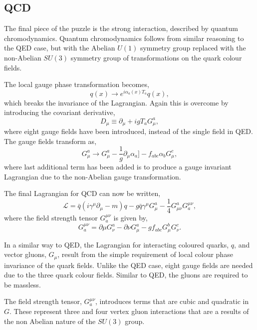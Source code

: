 \subsection{QCD}
The final piece of the puzzle is the strong interaction, described by quantum
chromodynamics. 
Quantum chromodynamics follows from similar reasoning to the QED case, but with
the Abelian $U(1)$ symmetry group replaced with the non-Abelian $SU(3)$ symmetry
group of transformations on the quark colour fields.

The local gauge phase transformation becomes,
\begin{equation}
q(x) \to e^{i\alpha_a(x)T_a} q(x),
\end{equation}
which breaks the invariance of the Lagrangian. Again this is overcome by
introducing the covariant derivative,
\begin{equation}
D_{\mu} \equiv \partial_{\mu} + i g T_{a} G_{\mu}^{a},
\end{equation}
where eight gauge fields have been introduced, instead of the single field in
QED.   The gauge fields transform as,
\begin{equation}
 G_{\mu}^{a} \to G_{\mu}^{a} 
-\frac{1}{g}\partial_{\mu}\alpha_{a}]
-f_{abc}\alpha_{b}G^{c}_{\mu},
\end{equation}
where last additional term has been added is to produce a gauge invariant
Lagrangian due to the non-Abelian gauge transformation.

The final Lagrangian for QCD can now be written,
\begin{equation}
\mathcal{L} = 
\bar{q}(i\gamma^{\mu}\partial_{\mu} - m)q -
g \bar{q} \gamma^{\mu} G_{\mu}^{a} - 
\frac{1}{4} G_{\mu\nu}^{a} G^{\mu\nu}_{a},
\end{equation}
where the field strength tensor $G^{\mu\nu}_{a}$ is given by,
\begin{equation}
G^{\mu\nu}_{a} 
= \partial{\mu} G^{a}_{\nu}
- \partial{\nu} G^{a}_{\mu}
-g f_{abc} G^{b}_{\mu} G^{c}_{\nu}.
\end{equation}

In a similar way to QED, the Lagrangian for interacting coloured quarks, $q$, and
vector gluons, $G_{\mu}$, result from the simple requirement of local colour
phase invariance of the quark fields. Unlike the QED case, eight gauge fields
are needed due to the three quark colour fields.  Similar to QED, the gluons are
required to  be massless.

The field strength tensor, $G^{\mu\nu}_{a}$, introduces terms that are cubic and
quadratic in $G$. These represent three and four vertex gluon interactions that
are a results of the non Abelian nature of the $SU(3)$ group.

